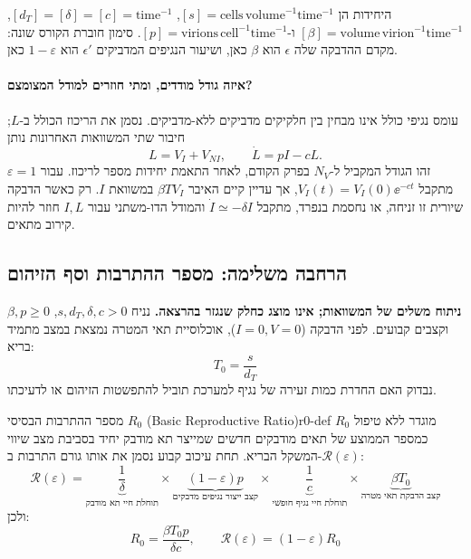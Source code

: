 היחידות הן $[s]=\text{cells}\,\text{volume}^{-1}\text{time}^{-1}$, $[d_T]=[\delta]=[c]=\text{time}^{-1}$, $[\beta]=\text{volume}\,\text{virion}^{-1}\text{time}^{-1}$ ו-$[p]=\text{virions}\,\text{cell}^{-1}\text{time}^{-1}$. סימון חוברת הקורס שונה: מקדם ההדבקה שלה $\epsilon$ הוא $\beta$ כאן, ושיעור הנגיפים המדביקים $\epsilon'$ הוא $1-\varepsilon$ כאן.

\paragraph{איזה גודל מודדים, ומתי חוזרים למודל המצומצם?}
עומס נגיפי כולל אינו מבחין בין חלקיקים מדביקים ללא-מדביקים. נסמן את הריכוז הכולל ב-$L$; חיבור שתי המשוואות האחרונות נותן
\begin{equation}\label{eq:hiv4-total-load}
L=V_I+V_{NI},\qquad \dot L=pI-cL.
\end{equation}
זהו הגודל המקביל ל-$N_V$ בפרק הקודם, לאחר התאמת יחידות מספר לריכוז. עבור $\varepsilon=1$ מתקבל $V_I(t)=V_I(0)\ee^{-ct}$, אך עדיין קיים האיבר $\beta TV_I$ במשוואת $I$. רק כאשר הדבקה שיורית זו זניחה, או נחסמת בנפרד, מתקבל $\dot I\simeq-\delta I$ והמודל הדו-משתני עבור $I,L$ חוזר להיות קירוב מתאים.

\subsection{הרחבה משלימה: מספר ההתרבות וסף הזיהום}
\textbf{ניתוח משלים של המשוואות; אינו מוצג כחלק שנגזר בהרצאה.}
נניח $s,d_T,\delta,c>0$, $\beta,p\ge0$ וקצבים קבועים.
לפני הדבקה ($I=0, V=0$), אוכלוסיית תאי המטרה נמצאת במצב מתמיד בריא:
\begin{equation}
T_0 = \frac{s}{d_T}
\end{equation}
נבדוק האם החדרת כמות זעירה של נגיף למערכת תוביל להתפשטות הזיהום או לדעיכתו.

\begin{definition}{מספר ההתרבות הבסיסי $R_0$ (\textenglish{Basic Reproductive Ratio})}{r0-def}
$R_0$ מוגדר ללא טיפול כמספר הממוצע של תאים מודבקים חדשים שמייצר תא מודבק יחיד בסביבת מצב שיווי המשקל הבריא. תחת עיכוב קבוע נסמן את אותו גורם התרבות ב-$\mathcal R(\varepsilon)$:
\begin{equation}\label{eq:r0-derivation}
\mathcal R(\varepsilon) = \underbrace{\frac{1}{\delta}}_{\text{תוחלת חיי תא מודבק}} \times \underbrace{(1-\varepsilon)p}_{\text{קצב ייצור נגיפים מדבקים}} \times \underbrace{\frac{1}{c}}_{\text{תוחלת חיי נגיף חופשי}} \times \underbrace{\beta T_0}_{\text{קצב הדבקת תאי מטרה}}
\end{equation}
ולכן:
\begin{equation}\label{eq:r0-formula}
\boxed{R_0 = \frac{\beta T_0 p}{\delta c},\qquad \mathcal R(\varepsilon)=(1-\varepsilon)R_0}
\end{equation}
\end{definition}

